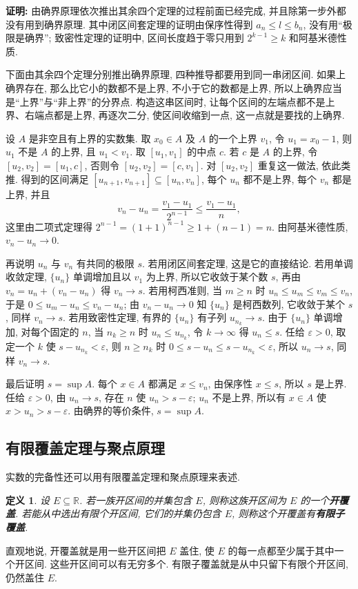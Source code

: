 \documentclass[UTF8,openany]{ctexbook}
\theoremstyle{chinesetextbook}
\newtheorem{definition}{定义}[section]
\newenvironment{cnproof}{\par\indent\textbf{证明:} \ignorespaces}{\par}
\begin{document}
\begin{cnproof}
由确界原理依次推出其余四个定理的过程前面已经完成, 并且除第一步外都没有用到确界原理. 其中闭区间套定理的证明由保序性得到 $a_n\le l\le b_n$, 没有用“极限是确界”; 致密性定理的证明中, 区间长度趋于零只用到 $2^{k-1}\ge k$ 和阿基米德性质.

下面由其余四个定理分别推出确界原理, 四种推导都要用到同一串闭区间. 如果上确界存在, 那么比它小的数都不是上界, 不小于它的数都是上界, 所以上确界应当是“上界”与“非上界”的分界点. 构造这串区间时, 让每个区间的左端点都不是上界、右端点都是上界, 再逐次二分, 使区间收缩到一点, 这一点就是要找的上确界.

设 $A$ 是非空且有上界的实数集. 取 $x_0\in A$ 及 $A$ 的一个上界 $v_1$, 令 $u_1=x_0-1$, 则 $u_1$ 不是 $A$ 的上界, 且 $u_1<v_1$. 取 $[u_1,v_1]$ 的中点 $c$. 若 $c$ 是 $A$ 的上界, 令 $[u_2,v_2]=[u_1,c]$, 否则令 $[u_2,v_2]=[c,v_1]$. 对 $[u_2,v_2]$ 重复这一做法, 依此类推. 得到的区间满足 $[u_{n+1},v_{n+1}]\subseteq[u_n,v_n]$, 每个 $u_n$ 都不是上界, 每个 $v_n$ 都是上界, 并且
\[
v_n-u_n=\frac{v_1-u_1}{2^{n-1}}\le\frac{v_1-u_1}n,
\]
这里由二项式定理得 $2^{n-1}=(1+1)^{n-1}\ge1+(n-1)=n$. 由阿基米德性质, $v_n-u_n\to0$.

再说明 $u_n$ 与 $v_n$ 有共同的极限 $s$. 若用闭区间套定理, 这是它的直接结论. 若用单调收敛定理, $\{u_n\}$ 单调增加且以 $v_1$ 为上界, 所以它收敛于某个数 $s$, 再由 $v_n=u_n+(v_n-u_n)$ 得 $v_n\to s$. 若用柯西准则, 当 $m\ge n$ 时 $u_n\le u_m\le v_m\le v_n$, 于是 $0\le u_m-u_n\le v_n-u_n$; 由 $v_n-u_n\to0$ 知 $\{u_n\}$ 是柯西数列, 它收敛于某个 $s$, 同样 $v_n\to s$. 若用致密性定理, 有界的 $\{u_n\}$ 有子列 $u_{n_k}\to s$. 由于 $\{u_n\}$ 单调增加, 对每个固定的 $n$, 当 $n_k\ge n$ 时 $u_n\le u_{n_k}$, 令 $k\to\infty$ 得 $u_n\le s$. 任给 $\varepsilon>0$, 取定一个 $k$ 使 $s-u_{n_k}<\varepsilon$, 则 $n\ge n_k$ 时 $0\le s-u_n\le s-u_{n_k}<\varepsilon$, 所以 $u_n\to s$, 同样 $v_n\to s$.

最后证明 $s=\sup A$. 每个 $x\in A$ 都满足 $x\le v_n$, 由保序性 $x\le s$, 所以 $s$ 是上界. 任给 $\varepsilon>0$, 由 $u_n\to s$, 存在 $n$ 使 $u_n>s-\varepsilon$; $u_n$ 不是上界, 所以有 $x\in A$ 使 $x>u_n>s-\varepsilon$. 由确界的等价条件, $s=\sup A$.
\end{cnproof}
\subsection{有限覆盖定理与聚点原理}
实数的完备性还可以用有限覆盖定理和聚点原理来表述.
\begin{definition}
设 $E\subseteq\mathbb R$. 若一族开区间的并集包含 $E$, 则称这族开区间为 $E$ 的一个\textbf{开覆盖}. 若能从中选出有限个开区间, 它们的并集仍包含 $E$, 则称这个开覆盖有\textbf{有限子覆盖}.
\end{definition}
直观地说, 开覆盖就是用一些开区间把 $E$ 盖住, 使 $E$ 的每一点都至少属于其中一个开区间. 这些开区间可以有无穷多个. 有限子覆盖就是从中只留下有限个开区间, 仍然盖住 $E$.
\end{document}
